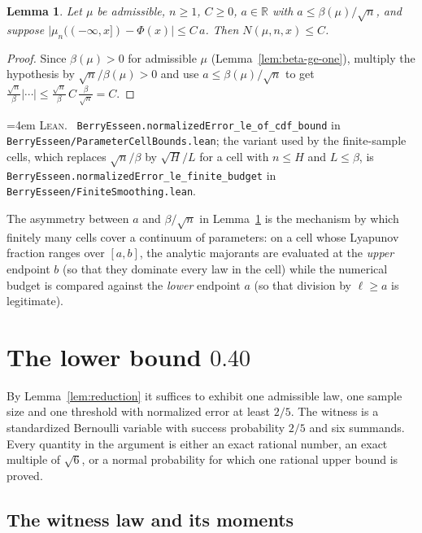 \documentclass[10pt,a4paper]{article}
\theoremstyle{plain}
\newtheorem{lemma}[theorem]{Lemma}
\theoremstyle{definition}
\newcommand{\R}{\mathbb{R}}
\newcommand{\lean}[1]{\texttt{#1}}
\newcommand{\file}[1]{\texttt{#1}}
\newenvironment{leanref}%
  {\par\addvspace{3pt}\begingroup\sloppy\emergencystretch=4em
   \noindent\footnotesize\textsc{Lean.}\ \ignorespaces}%
  {\par\endgroup\addvspace{3pt}}
\begin{document}
\begin{lemma}\label{lem:cdf-to-normalized}
Let $\mu$ be admissible, $n\ge1$, $C\ge0$, $a\in\R$ with
$a\le\beta(\mu)/\sqrt n$, and suppose
$\bigl|\mu_n(({-\infty},x])-\Phi(x)\bigr|\le C\,a$. Then
$N(\mu,n,x)\le C$.
\end{lemma}

\begin{proof}
Since $\beta(\mu)>0$ for admissible $\mu$ (Lemma~\ref{lem:beta-ge-one}),
multiply the hypothesis by $\sqrt n/\beta(\mu)>0$ and use
$a\le\beta(\mu)/\sqrt n$ to get
$\frac{\sqrt n}{\beta}|{\cdots}|\le \frac{\sqrt n}{\beta}\,C\,\frac{\beta}{\sqrt n}=C$.
\end{proof}

\begin{leanref}
\lean{BerryEsseen.normalizedError\_le\_of\_cdf\_bound} in
\file{BerryEsseen/ParameterCellBounds.lean}; the variant used by the
finite-sample cells, which replaces $\sqrt n/\beta$ by $\sqrt H/L$ for a cell
with $n\le H$ and $L\le\beta$, is
\lean{BerryEsseen.normalizedError\_le\_finite\_budget} in
\file{BerryEsseen/FiniteSmoothing.lean}.
\end{leanref}

The asymmetry between $a$ and $\beta/\sqrt n$ in
Lemma~\ref{lem:cdf-to-normalized} is the mechanism by which finitely many
cells cover a continuum of parameters: on a cell whose Lyapunov fraction
ranges over $[a,b]$, the analytic majorants are evaluated at the \emph{upper}
endpoint $b$ (so that they dominate every law in the cell) while the numerical
budget is compared against the \emph{lower} endpoint $a$ (so that division by
$\ell\ge a$ is legitimate).

\section{The lower bound $0.40$}
\label{sec:lower}

By Lemma~\ref{lem:reduction} it suffices to exhibit one admissible law, one
sample size and one threshold with normalized error at least $2/5$. The
witness is a standardized Bernoulli variable with success probability $2/5$ and
six summands. Every quantity in the argument is either an exact rational
number, an exact multiple of $\sqrt6$, or a normal probability for which one
rational upper bound is proved.

\subsection{The witness law and its moments}
\end{document}
